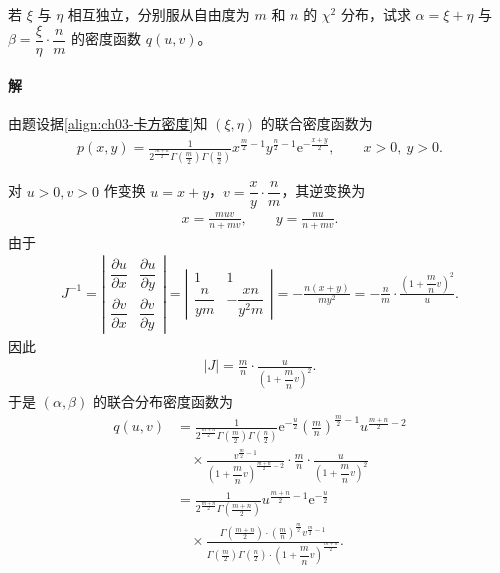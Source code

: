 \documentclass[../../main.tex]{subfiles}
\begin{document}
\begin{example}\label{example:ch03-卡方可加}
若 $\xi$ 与 $\eta$ 相互独立，分别服从自由度为 $m$ 和 $n$ 的 $\chi^{2}$ 分布，试求 $\alpha=\xi+\eta$ 与 $\beta=\dfrac{\xi}{\eta}\cdot\dfrac{n}{m}$ 的密度函数 $q(u,v)$。

\paragraph*{解}由题设据\eqref{align:ch03-卡方密度}知 $(\xi,\eta)$ 的联合密度函数为
\begin{align*}p(x,y)=\frac{1}{2^{\frac{m+n}{2}}\Gamma\!\left(\frac{m}{2}\right)\Gamma\!\left(\frac{n}{2}\right)}x^{\frac{m}{2}-1}y^{\frac{n}{2}-1}\mathrm{e}^{-\frac{x+y}{2}},\qquad x>0,\ y>0.\end{align*}

对 $u>0,v>0$ 作变换 $u=x+y$，$v=\dfrac{x}{y}\cdot\dfrac{n}{m}$，其逆变换为
\begin{align*}x=\frac{muv}{n+mv},\qquad y=\frac{nu}{n+mv}.\end{align*}
由于
\begin{align*}
J^{-1}=\left|\begin{array}{cc}
\dfrac{\partial u}{\partial x} & \dfrac{\partial u}{\partial y}\\[4pt]
\dfrac{\partial v}{\partial x} & \dfrac{\partial v}{\partial y}
\end{array}\right|=\left|\begin{array}{cc}
1 & 1\\
\dfrac{n}{ym} & -\dfrac{xn}{y^{2}m}
\end{array}\right|=-\frac{n(x+y)}{my^{2}}
=-\frac{n}{m}\cdot\frac{\left(1+\dfrac{m}{n}v\right)^{2}}{u}.
\end{align*}
因此
\begin{align*}|J|=\frac{m}{n}\cdot\frac{u}{\left(1+\dfrac{m}{n}v\right)^{2}}.\end{align*}
于是 $(\alpha,\beta)$ 的联合分布密度函数为
\begin{align*}
q(u,v)&=\frac{1}{2^{\frac{m+n}{2}}\Gamma\!\left(\frac{m}{2}\right)\Gamma\!\left(\frac{n}{2}\right)}\mathrm{e}^{-\frac{u}{2}}\left(\frac{m}{n}\right)^{\frac{m}{2}-1}u^{\frac{m+n}{2}-2}\\
&\quad\times\frac{v^{\frac{m}{2}-1}}{\left(1+\dfrac{m}{n}v\right)^{\frac{m+n}{2}-2}}\cdot\frac{m}{n}\cdot\frac{u}{\left(1+\dfrac{m}{n}v\right)^{2}}\\
&=\frac{1}{2^{\frac{m+n}{2}}\Gamma\!\left(\frac{m+n}{2}\right)}u^{\frac{m+n}{2}-1}\mathrm{e}^{-\frac{u}{2}}\\
&\quad\times\frac{\Gamma\!\left(\frac{m+n}{2}\right)\cdot\left(\frac{m}{n}\right)^{\frac{m}{2}}v^{\frac{m}{2}-1}}{\Gamma\!\left(\frac{m}{2}\right)\Gamma\!\left(\frac{n}{2}\right)\cdot\left(1+\dfrac{m}{n}v\right)^{\frac{m+n}{2}}}.
\end{align*}


\end{example}
\end{document}
